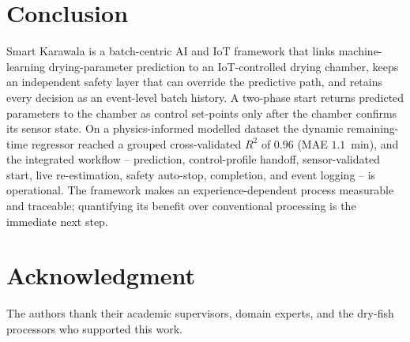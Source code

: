 \documentclass[conference]{IEEEtran}
\begin{document}
\section{Conclusion}
Smart Karawala is a batch-centric AI and IoT framework that links
machine-learning drying-parameter prediction to an IoT-controlled drying
chamber, keeps an independent safety layer that can override the predictive
path, and retains every decision as an event-level batch history. A
two-phase start returns predicted parameters to the chamber as control
set-points only after the chamber confirms its sensor state. On a
physics-informed modelled dataset the dynamic remaining-time regressor
reached a grouped cross-validated $R^{2}$ of $0.96$ (MAE $1.1$~min), and
the integrated workflow -- prediction, control-profile handoff,
sensor-validated start, live re-estimation, safety auto-stop, completion,
and event logging -- is operational. The framework makes an
experience-dependent process measurable and traceable; quantifying its
benefit over conventional processing is the immediate next step.

\section*{Acknowledgment}
The authors thank their academic supervisors, domain experts, and the
dry-fish processors who supported this work.
\end{document}
